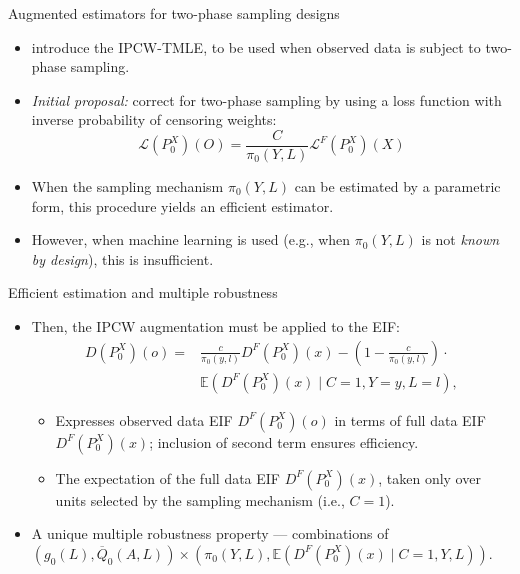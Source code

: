 \documentclass{beamer}
\newcommand{\E}{\mathbb{E}}
\newcommand{\lik}{\mathcal{L}}
\begin{document}
\begin{frame}[c]{Augmented estimators for two-phase sampling designs}

\begin{center}
\begin{itemize}
  \itemsep10pt
  \item \cite{rose2011targeted2sd} introduce the IPCW-TMLE, to be used when
    observed data is subject to two-phase sampling.
  \item \textit{Initial proposal:} correct for two-phase sampling by using a
    loss function with inverse probability of censoring weights:
    \begin{equation*}
      \lik(P_0^X)(O) = \frac{C}{\pi_0(Y, L)}\lik^F(P_0^X)(X)
    \end{equation*}
  \item When the sampling mechanism $\pi_0(Y,L)$ can be estimated by
    a parametric form, this procedure yields an efficient estimator.
  \item However, when machine learning is used (e.g., when $\pi_0(Y,L)$ is not
    \textit{known by design}), this is insufficient.
\end{itemize}
\end{center}

\note{
}

\end{frame}


\begin{frame}[c]{Efficient estimation and multiple robustness}

\begin{center}
\begin{itemize}
  \itemsep10pt
  \item Then, the IPCW augmentation must be applied to the EIF:
    \begin{align*}
      D(P_0^X)(o) = &\frac{c}{\pi_0(y, l)} D^F(P_0^X)(x) - \left(1 -
        \frac{c}{\pi_0(y, l)}\right) \cdot \\ &\E(D^F(P_0^X)(x) \mid
        C = 1, Y = y, L = l),
    \end{align*}
   \begin{itemize}
    \itemsep6pt
     \item Expresses observed data EIF $D^F(P_0^X)(o)$ in terms of full data
       EIF $D^F(P_0^X)(x)$; inclusion of second term ensures efficiency.
     \item The expectation of the full data EIF $D^F(P_0^X)(x)$, taken only over
      units selected by the sampling mechanism (i.e., $C = 1$).
  \end{itemize}
 \item A unique multiple robustness property --- combinations of
    $(g_0(L), \overline{Q}_0(A,L)) \times (\pi_0(Y, L), \E(D^F(P^X_0)(x) \mid
    C = 1, Y, L))$.
\end{itemize}
\end{center}

\note{
}

\end{frame}
\end{document}

